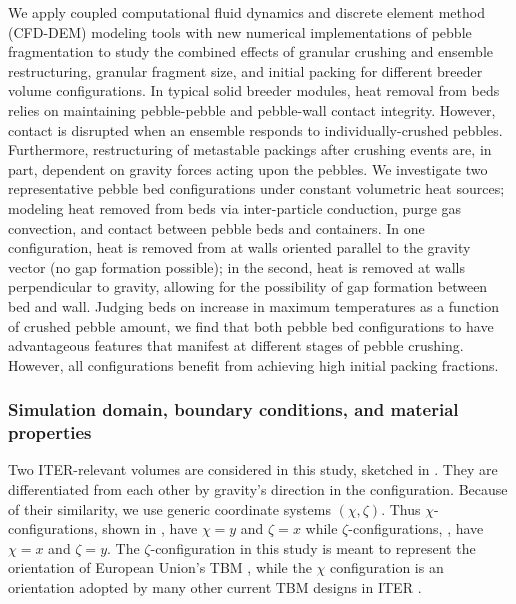 We apply coupled computational fluid dynamics and discrete element method (CFD-DEM) modeling tools with new numerical implementations of pebble fragmentation to study the combined effects of granular crushing and ensemble restructuring, granular fragment size, and initial packing for different breeder volume configurations. In typical solid breeder modules, heat removal from beds relies on maintaining pebble-pebble and pebble-wall contact integrity. However, contact is disrupted when an ensemble responds to individually-crushed pebbles. Furthermore, restructuring of metastable packings after crushing events are, in part, dependent on gravity forces acting upon the pebbles. We investigate two representative pebble bed configurations under constant volumetric heat sources; modeling heat removed from beds via inter-particle conduction, purge gas convection, and contact between pebble beds and containers. In one configuration, heat is removed from at walls oriented parallel to the gravity vector (no gap formation possible); in the second, heat is removed at walls perpendicular to gravity, allowing for the possibility of gap formation between bed and wall. Judging beds on increase in maximum temperatures as a function of crushed pebble amount, we find that both pebble bed configurations to have advantageous features that manifest at different stages of pebble crushing. However, all configurations benefit from achieving high initial packing fractions.



\subsubsection{Simulation domain, boundary conditions, and material properties}

Two ITER-relevant volumes are considered in this study, sketched in . They are differentiated from each other by gravity's direction in the configuration. Because of their similarity, we use generic coordinate systems $(\chi, \zeta)$. Thus $\chi$-configurations, shown in , have $\chi = y$ and $\zeta = x$ while $\zeta$-configurations, , have $\chi = x$ and $\zeta = y$. The $\zeta$-configuration in this study is meant to represent the orientation of European Union's TBM \cite{Hernandez2013}, while the $\chi$ configuration is an orientation adopted by many other current TBM designs in ITER \cite{Cho2008,Feng2012a}.

